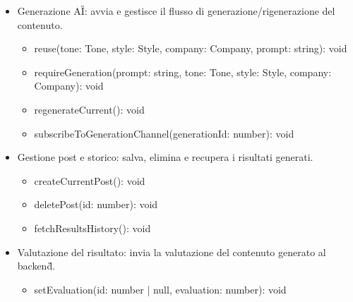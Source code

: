 \documentclass[a4paper,11pt]{article}
\begin{document}
\begin{itemize}[noitemsep, topsep=0pt]
  \item Generazione AI\G{}: avvia e gestisce il flusso di generazione/rigenerazione del contenuto.
  \begin{itemize}[noitemsep, topsep=0pt]
    \item reuse(tone: Tone, style: Style, company: Company, prompt: string): void
    \item requireGeneration(prompt: string, tone: Tone, style: Style, company: Company): void
    \item regenerateCurrent(): void
    \item subscribeToGenerationChannel(generationId: number): void
  \end{itemize}

  \item Gestione post e storico: salva, elimina e recupera i risultati generati.
  \begin{itemize}[noitemsep, topsep=0pt]
    \item createCurrentPost(): void
    \item deletePost(id: number): void
    \item fetchResultsHistory(): void
  \end{itemize}

  \item Valutazione del risultato: invia la valutazione del contenuto generato al backend\G{}.
  \begin{itemize}[noitemsep, topsep=0pt]
    \item setEvaluation(id: number | null, evaluation: number): void
  \end{itemize}
\end{itemize}
\end{document}
